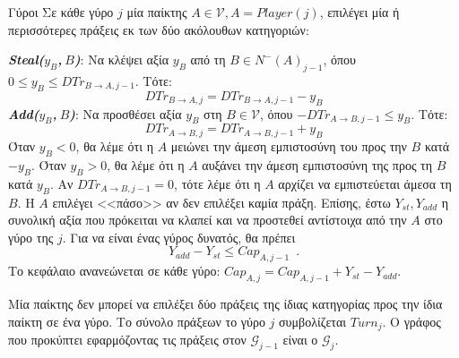 {}
\begin{definitiongr}{Γύροι}
  Σε κάθε γύρο $j$ μία παίκτης $A \in \mathcal{V}, A = Player\left(j\right)$, επιλέγει μία ή περισσότερες πράξεις εκ των δύο
  ακόλουθων κατηγοριών:

  \noindent \textit{\textbf{\textlatin{Steal}($y_B$,$\:B$)}}: Να κλέψει αξία $y_B$ από τη $B \in N^{-}\left(A\right)_{j-1}$,
  όπου $0 \leq y_B \leq DTr_{B \rightarrow A, j-1}$. Τότε:
  \begin{equation*}
     DTr_{B \rightarrow A, j} = DTr_{B \rightarrow A, j-1} - y_B
  \end{equation*}
  \noindent \textit{\textbf{\textlatin{Add}($y_B$,$\:B$)}}: Να προσθέσει αξία $y_B$ στη $B \in \mathcal{V}$, όπου
  $-DTr_{A \rightarrow B, j-1} \leq y_B$. Τότε:
  \begin{equation*}
     DTr_{A \rightarrow B, j} = DTr_{A \rightarrow B, j-1} + y_B
  \end{equation*}
  Όταν $y_B < 0$, θα λέμε ότι η $A$ μειώνει την άμεση εμπιστοσύνη του προς την $B$ κατά $-y_B$. Όταν $y_B > 0$, θα λέμε ότι η
  $A$ αυξάνει την άμεση εμπιστοσύνη της προς τη $B$ κατά $y_B$. Αν $DTr_{A \rightarrow B, j-1} = 0$, τότε λέμε ότι η $A$
  αρχίζει να εμπιστεύεται άμεσα τη $B$. Η $A$ επιλέγει <<πάσο>> αν δεν επιλέξει καμία πράξη. Επίσης, έστω $Y_{st}, Y_{add}$ η
  συνολική αξία που πρόκειται να κλαπεί και να προστεθεί αντίστοιχα από την $A$ στο γύρο της $j$. Για να είναι ένας γύρος
  δυνατός, θα πρέπει
  \begin{equation}
     Y_{add} - Y_{st} \leq Cap_{A, j-1} \enspace.
  \end{equation}
  Το κεφάλαιο ανανεώνεται σε κάθε γύρο: $Cap_{A, j} = Cap_{A, j-1} + Y_{st} - Y_{add}$.

  Μία παίκτης δεν μπορεί να επιλέξει δύο πράξεις της ίδιας κατηγορίας προς την ίδια παίκτη σε ένα γύρο. Το σύνολο πράξεων
  το γύρο $j$ συμβολίζεται $Turn_j$. Ο γράφος που προκύπτει εφαρμόζοντας τις πράξεις στον $\mathcal{G}_{j-1}$ είναι ο
  $\mathcal{G}_j$.
\end{definitiongr}
